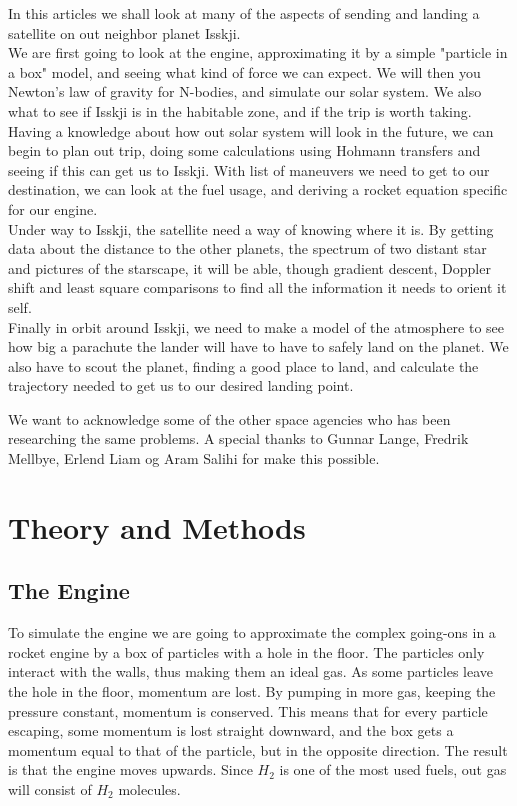 \documentclass[a4paper, 10pt]{article}
\begin{document}
In this articles we shall look at many of the aspects of sending and landing a satellite on out neighbor planet Isskji. \\

We are first going to look at the engine, approximating it by a simple "particle in a box" model, and seeing what kind of force we can expect. We will then you Newton's law of gravity for N-bodies, and simulate our solar system. We also what to see if Isskji is in the habitable zone, and if the trip is worth taking. Having a knowledge about how out solar system will look in the future, we can begin to plan out trip, doing some calculations using Hohmann transfers and seeing if this can get us to Isskji. With list of maneuvers we need to get to our destination, we can look at the fuel usage, and deriving a rocket equation specific for our engine. \\

Under way to Isskji, the satellite need a way of knowing where it is. By getting data about the distance to the other planets, the spectrum of two distant star and pictures of the starscape, it will be able, though gradient descent, Doppler shift and least square comparisons to find all the information it needs to orient it self.\\

Finally in orbit around Isskji, we need to make a model of the atmosphere to see how big a parachute the lander will have to have to safely land on the planet. We also have to scout the planet, finding a good place to land, and calculate the trajectory needed to get us to our desired landing point.

We want to acknowledge some of the other space agencies who has been researching the same problems. A special thanks to Gunnar Lange, Fredrik Mellbye, Erlend Liam og Aram Salihi for make this possible.

\section{Theory and Methods}

\subsection{The Engine}

To simulate the engine we are going to approximate the complex going-ons in a rocket engine by a box of particles with a hole in the floor. The particles only interact with the walls, thus making them an ideal gas. As some particles leave the hole in the floor, momentum are lost. By pumping in more gas, keeping the pressure constant, momentum is conserved. This means that for every particle escaping, some momentum is lost straight downward, and the box gets a momentum equal to that of the particle, but in the opposite direction. The result is that the engine moves upwards. Since $H_2$ is one of the most used fuels, out gas will consist of $H_2$ molecules.\\
\end{document}
